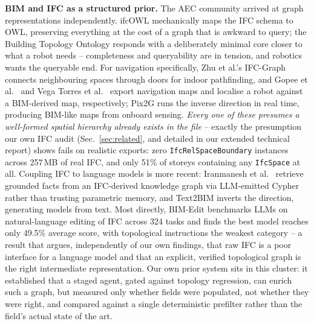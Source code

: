 \documentclass[a4paper, 10pt, conference]{ieeeconf}
\begin{document}
\textbf{BIM and IFC as a structured prior.} The AEC community arrived at graph representations independently. ifcOWL \cite{pauwels2016ifcowl} mechanically maps the IFC schema to OWL, preserving everything at the cost of a graph that is awkward to query; the Building Topology Ontology \cite{rasmussen2021bot} responds with a deliberately minimal core closer to what a robot needs -- completeness and queryability are in tension, and robotics wants the queryable end. For navigation specifically, Zhu et al.'s IFC-Graph \cite{zhu2025ifcgraph} connects neighbouring spaces through doors for indoor pathfinding, and Gopee et al.\ \cite{gopee2023ifcnav} and Vega Torres et al.\ \cite{vegatorres2023bimlidar} export navigation maps and localise a robot against a BIM-derived map, respectively; Pix2G \cite{longo2025pix2g} runs the inverse direction in real time, producing BIM-like maps from onboard sensing. \emph{Every one of these presumes a well-formed spatial hierarchy already exists in the file} -- exactly the presumption our own IFC audit (Sec.~\ref{sec:related}, and detailed in our extended technical report) shows fails on realistic exports: zero \texttt{IfcRelSpaceBoundary} instances across 257\,MB of real IFC, and only 51\% of storeys containing any \texttt{IfcSpace} at all. Coupling IFC to language models is more recent: Iranmanesh et al.\ \cite{iranmanesh2025graphrag} retrieve grounded facts from an IFC-derived knowledge graph via LLM-emitted Cypher rather than trusting parametric memory, and Text2BIM \cite{du2024text2bim} inverts the direction, generating models from text. Most directly, BIM-Edit \cite{nithyanantham2026bimedit} benchmarks LLMs on natural-language editing of IFC across 324 tasks and finds the best model reaches only 49.5\% average score, with topological instructions the weakest category -- a result that argues, independently of our own findings, that raw IFC is a poor interface for a language model and that an explicit, verified topological graph is the right intermediate representation. Our own prior system \cite{nedungadi2026robobimws} sits in this cluster: it established that a staged agent, gated against topology regression, can enrich such a graph, but measured only whether fields were populated, not whether they were right, and compared against a single deterministic prefilter rather than the field's actual state of the art.
\end{document}

